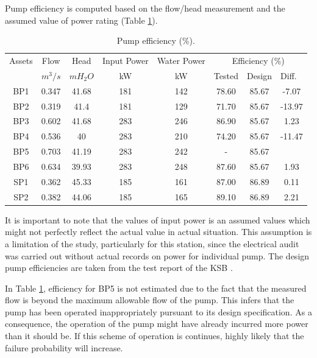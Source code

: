 Pump efficiency is computed based on the flow/head measurement and the assumed value of power rating (Table \ref{ch05_tbl_efficiency}). 
\begin{table}[!h]
	\caption{Pump efficiency (\%).}
	\label{ch05_tbl_efficiency}
	{\footnotesize
\begin{tabular}{c|c|c|c|c|c|l|l}
	\hline
	Assets & Flow & Head & Input Power & Water Power & \multicolumn{3}{c}{Efficiency (\%)} \\ 
	\cline{6-8}
	& $m^3/s$ & $mH_2O$ & kW & kW & Tested & Design & Diff. \\ 
	\hline
	BP1 & 0.347 & 41.68 & 181 & 142 & 78.60 & \multicolumn{1}{c|}{85.67} & \multicolumn{1}{c}{-7.07} \\ 
	BP2 & 0.319 & 41.4 & 181 & 129 & 71.70 & \multicolumn{1}{c|}{85.67} & \multicolumn{1}{c}{-13.97} \\ 
	BP3 & 0.602 & 41.68 & 283 & 246 & 86.90 & \multicolumn{1}{c|}{85.67} & \multicolumn{1}{c}{1.23} \\ 
	BP4 & 0.536 & 40 & 283 & 210 & 74.20 & \multicolumn{1}{c|}{85.67} & \multicolumn{1}{c}{-11.47} \\ 
	BP5 & 0.703 & 41.19 & 283 & 242 & - & \multicolumn{1}{c|}{85.67} & \multicolumn{1}{c}{} \\ 
	BP6 & 0.634 & 39.93 & 283 & 248 & 87.60 & \multicolumn{1}{c|}{85.67} & \multicolumn{1}{c}{1.93} \\ 
	SP1 & 0.362 & 45.33 & 185 & 161 & 87.00 & \multicolumn{1}{c|}{86.89} & \multicolumn{1}{c}{0.11} \\ 
	SP2 & 0.382 & 44.06 & 185 & 165 & 89.10 & \multicolumn{1}{c|}{86.89} & \multicolumn{1}{c}{2.21} \\ 
	\hline
\end{tabular}
	}
\end{table}

It is important to note that the values of input power is an assumed values which might not perfectly reflect the actual value in actual situation. This assumption is a limitation of the study, particularly for this station, since the electrical audit was carried out without actual records on power for individual pump. The design pump efficiencies are taken from the test report of the KSB \cite{KSB2010}. 

In Table \ref{ch05_tbl_efficiency}, efficiency for BP5 is not estimated due to the fact that the measured flow is beyond the maximum allowable flow of the pump. This infers that the pump has been operated inappropriately pursuant to its design specification. As a consequence, the operation of the pump might have already incurred more power than it should be. If this scheme of operation is continues, highly likely that the failure probability will increase. 

